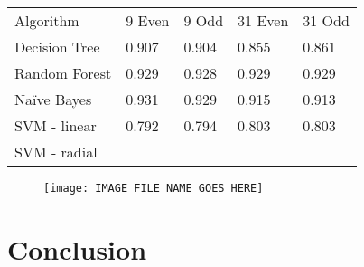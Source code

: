 \documentclass[aps, reprint, amsmath, amssymb]{revtex4-1}
\begin{document}
\begin{center}
  \begin{tabular}{ | l || l | l | l | l |}
    \hline
    Algorithm & 9 Even & 9 Odd & 31 Even & 31 Odd \\ \hhline{|=||=|=|=|=|}

    Decision Tree & 0.907 & 0.904 & 0.855 & 0.861 \\ \hline

    Random Forest & 0.929 & 0.928  & 0.929  & 0.929 \\ \hline

    Na{\"i}ve Bayes & 0.931  & 0.929 & 0.915 & 0.913 \\ \hline

    SVM - linear & 0.792 & 0.794 & 0.803 & 0.803 \\ \hline

    SVM - radial & & & & \\ 
    \hline
  \end{tabular}
\end{center}


\begin{figure}[t]
    \centering
    \texttt{[image: IMAGE FILE NAME GOES HERE]}
\end{figure}

\section{Conclusion}
\end{document}
